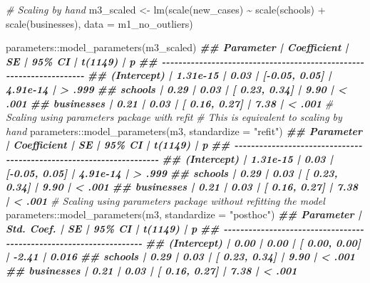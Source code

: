 \documentclass[
]{book}
\newenvironment{Shaded}{\begin{snugshade}}{\end{snugshade}}
\newcommand{\AttributeTok}[1]{\textcolor[rgb]{0.77,0.63,0.00}{#1}}
\newcommand{\CommentTok}[1]{\textcolor[rgb]{0.56,0.35,0.01}{\textit{#1}}}
\newcommand{\DocumentationTok}[1]{\textcolor[rgb]{0.56,0.35,0.01}{\textbf{\textit{#1}}}}
\newcommand{\FunctionTok}[1]{\textcolor[rgb]{0.00,0.00,0.00}{#1}}
\newcommand{\NormalTok}[1]{#1}
\newcommand{\OtherTok}[1]{\textcolor[rgb]{0.56,0.35,0.01}{#1}}
\newcommand{\SpecialCharTok}[1]{\textcolor[rgb]{0.00,0.00,0.00}{#1}}
\newcommand{\StringTok}[1]{\textcolor[rgb]{0.31,0.60,0.02}{#1}}
\begin{document}
\begin{Shaded}
\begin{Highlighting}[]
\CommentTok{\# Scaling \textquotesingle{}by hand\textquotesingle{}}
\NormalTok{m3\_scaled }\OtherTok{\textless{}{-}} \FunctionTok{lm}\NormalTok{(}\FunctionTok{scale}\NormalTok{(new\_cases) }\SpecialCharTok{\textasciitilde{}}
                  \FunctionTok{scale}\NormalTok{(schools) }\SpecialCharTok{+}
                  \FunctionTok{scale}\NormalTok{(businesses),}
                \AttributeTok{data =}\NormalTok{ m1\_no\_outliers)}

\NormalTok{parameters}\SpecialCharTok{::}\FunctionTok{model\_parameters}\NormalTok{(m3\_scaled)}
\DocumentationTok{\#\# Parameter   | Coefficient |   SE |        95\% CI |  t(1149) |      p}
\DocumentationTok{\#\# {-}{-}{-}{-}{-}{-}{-}{-}{-}{-}{-}{-}{-}{-}{-}{-}{-}{-}{-}{-}{-}{-}{-}{-}{-}{-}{-}{-}{-}{-}{-}{-}{-}{-}{-}{-}{-}{-}{-}{-}{-}{-}{-}{-}{-}{-}{-}{-}{-}{-}{-}{-}{-}{-}{-}{-}{-}{-}{-}{-}{-}{-}{-}{-}{-}{-}{-}{-}}
\DocumentationTok{\#\# (Intercept) |    1.31e{-}15 | 0.03 | [{-}0.05, 0.05] | 4.91e{-}14 | \textgreater{} .999}
\DocumentationTok{\#\# schools     |        0.29 | 0.03 | [ 0.23, 0.34] |     9.90 | \textless{} .001}
\DocumentationTok{\#\# businesses  |        0.21 | 0.03 | [ 0.16, 0.27] |     7.38 | \textless{} .001}
\CommentTok{\# Scaling using \textquotesingle{}parameters\textquotesingle{} package with refit}
\CommentTok{\# This is equivalent to scaling \textquotesingle{}by hand\textquotesingle{}}
\NormalTok{parameters}\SpecialCharTok{::}\FunctionTok{model\_parameters}\NormalTok{(m3, }\AttributeTok{standardize =} \StringTok{"refit"}\NormalTok{)}
\DocumentationTok{\#\# Parameter   | Coefficient |   SE |        95\% CI |  t(1149) |      p}
\DocumentationTok{\#\# {-}{-}{-}{-}{-}{-}{-}{-}{-}{-}{-}{-}{-}{-}{-}{-}{-}{-}{-}{-}{-}{-}{-}{-}{-}{-}{-}{-}{-}{-}{-}{-}{-}{-}{-}{-}{-}{-}{-}{-}{-}{-}{-}{-}{-}{-}{-}{-}{-}{-}{-}{-}{-}{-}{-}{-}{-}{-}{-}{-}{-}{-}{-}{-}{-}{-}{-}{-}}
\DocumentationTok{\#\# (Intercept) |    1.31e{-}15 | 0.03 | [{-}0.05, 0.05] | 4.91e{-}14 | \textgreater{} .999}
\DocumentationTok{\#\# schools     |        0.29 | 0.03 | [ 0.23, 0.34] |     9.90 | \textless{} .001}
\DocumentationTok{\#\# businesses  |        0.21 | 0.03 | [ 0.16, 0.27] |     7.38 | \textless{} .001}
\CommentTok{\# Scaling using \textasciigrave{}parameters\textasciigrave{} package without refitting the model}
\NormalTok{parameters}\SpecialCharTok{::}\FunctionTok{model\_parameters}\NormalTok{(m3, }\AttributeTok{standardize =} \StringTok{"posthoc"}\NormalTok{)}
\DocumentationTok{\#\# Parameter   | Std. Coef. |   SE |         95\% CI | t(1149) |      p}
\DocumentationTok{\#\# {-}{-}{-}{-}{-}{-}{-}{-}{-}{-}{-}{-}{-}{-}{-}{-}{-}{-}{-}{-}{-}{-}{-}{-}{-}{-}{-}{-}{-}{-}{-}{-}{-}{-}{-}{-}{-}{-}{-}{-}{-}{-}{-}{-}{-}{-}{-}{-}{-}{-}{-}{-}{-}{-}{-}{-}{-}{-}{-}{-}{-}{-}{-}{-}{-}{-}{-}}
\DocumentationTok{\#\# (Intercept) |       0.00 | 0.00 | [ 0.00,  0.00] |   {-}2.41 | 0.016 }
\DocumentationTok{\#\# schools     |       0.29 | 0.03 | [ 0.23,  0.34] |    9.90 | \textless{} .001}
\DocumentationTok{\#\# businesses  |       0.21 | 0.03 | [ 0.16,  0.27] |    7.38 | \textless{} .001}
\end{Highlighting}
\end{Shaded}
\end{document}

